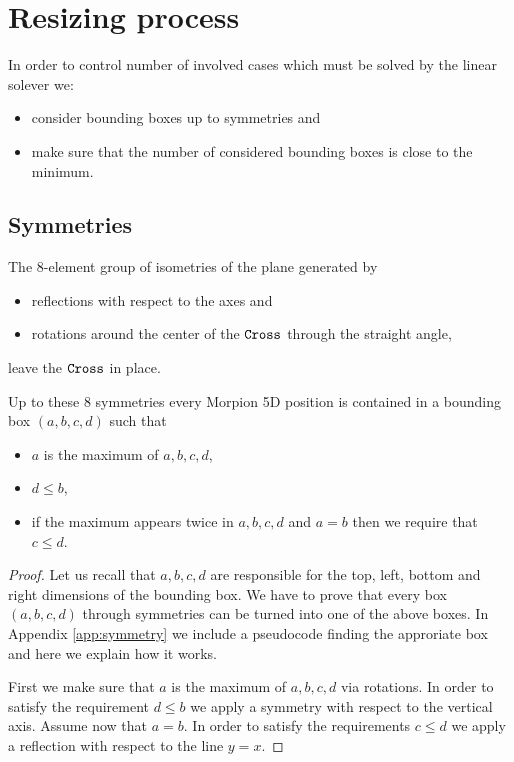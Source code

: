 \section{Resizing process}
\label{sec:gemmating}

In order to control number of involved cases which must be solved by the linear solever
we:\begin{itemize}
\item consider bounding boxes up to symmetries and 
\item make sure that the number of considered bounding boxes is close to the minimum.
\end{itemize}

\subsection{Symmetries}
\label{subsec:symmetries}
The $8$-element group of isometries of the plane generated by 
\begin{itemize}
\item reflections with respect to the axes and 
\item rotations around the center of the $\texttt{Cross}$ through the straight angle,
\end{itemize}
leave the $\texttt{Cross}$ in place. 
\begin{lemma}
Up to these $8$ symmetries every Morpion 5D position is contained in a bounding box $(a,b,c,d)$ such that
\begin{itemize}
\item $a$ is the maximum of $a,b,c,d$,
\item $d\leq b$,
\item if the maximum appears twice in $a,b,c,d$ and $a=b$ then we require that $c\leq d$. 
\end{itemize}
\end{lemma}

\begin{proof}
Let us recall that $a,b,c,d$ are responsible for the top, left, bottom and right dimensions of the bounding box. 
We have to prove that every box $(a,b,c,d)$ through symmetries can be turned into one of the above boxes. 
In Appendix \ref{app:symmetry} we include a pseudocode finding the approriate box and here we explain how it works. 

First we make sure that $a$ is the maximum 
of $a,b,c,d$ via rotations. In order to satisfy the requirement $d\leq b$ we apply a symmetry with respect to the vertical axis. 
Assume now that $a=b$. In order to satisfy the requirements  $c\leq d$ we apply a  reflection with respect to the line $y=x$.
\end{proof}


